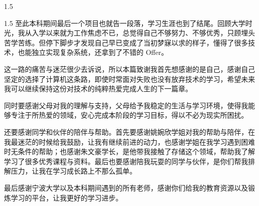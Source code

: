 \documentclass[a4paper,12pt,fontset=none,twoside]{article}
\numberwithin{figure}{section}
\numberwithin{equation}{section}
\numberwithin{table}{section}
\begin{document}
\begin{spacing}{1.5}
\begin{spacing}{1.5}
	至此本科期间最后一个项目也就告一段落，学习生涯也到了结尾。回顾大学时光，我从入学以来就为工作焦虑不已，总觉得自己不够努力、不够优秀，只顾埋头苦学苦练。但停下脚步才发现自己早已变成了当初梦寐以求的样子，懂得了很多技术，也能独立实现复杂系统，还拿到了不错的 Offer。
	
	这一路的痛苦与迷茫很少去诉说，所以本篇致谢我首先想感谢的是自己，感谢自己坚定的选择了计算机这条路，即使时常面对失败也没有放弃技术的学习，希望未来我可以继续保持这份对技术的纯粹热爱完成人生的下一篇章。

	同时要感谢父母对我的理解与支持，父母给予我稳定的生活与学习环境，使得我能够专注于所热爱的领域，安心完成本阶段的学习目标，得以不必为现实所困扰。
	
	还要感谢同学和伙伴的陪伴与帮助。首先要感谢姚婉欣学姐对我的帮助与陪伴，在我最迷茫的时候给我鼓励，让我有继续前进的动力，也感谢学姐在我学习遇到困难时无条件的帮助；也感谢朱文豪学长，是他带我接触了存储这个领域，帮助我了解学习了很多优秀课程与资料。最后也要感谢陪我玩耍的同学与伙伴，是你们帮我排解压力，让我在学习成长路上不那么孤单。

	最后感谢宁波大学以及本科期间遇到的所有老师，感谢你们给我的教育资源以及锻炼学习的平台，让我更好的学习进步。

	\end{spacing}


\end{spacing}
\end{document}
